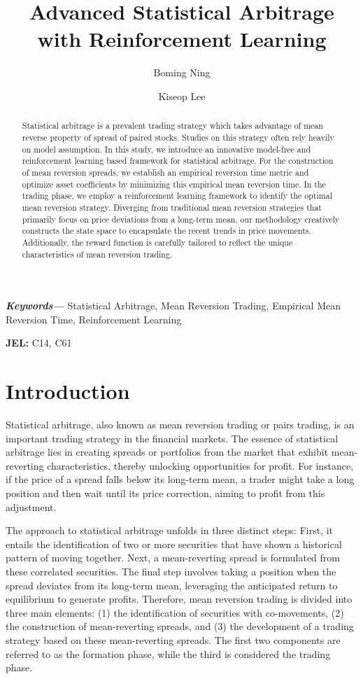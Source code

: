 \documentclass{article}
\title{Advanced Statistical Arbitrage with Reinforcement Learning}
\author[$\dag$,\thanks{Corresponding author. Email: ningb@purdue.edu}]{Boming Ning}
\author[$\dag$]{Kiseop Lee}
\affil[$\dag$]{Department of Statistics, Purdue University}
\providecommand{\keywords}[1]{\textbf{\textit{Keywords---}} #1}
\begin{document}
\maketitle

\begin{abstract}
Statistical arbitrage is a prevalent trading strategy which takes advantage of mean reverse property of spread of paired stocks. Studies on this strategy often rely heavily on model assumption. In this study, we introduce an innovative model-free and reinforcement learning based framework for statistical arbitrage. For the construction of mean reversion spreads, we establish an empirical reversion time metric and optimize asset coefficients by minimizing this empirical mean reversion time. In the trading phase, we employ a reinforcement learning framework to identify the optimal mean reversion strategy. Diverging from traditional mean reversion strategies that primarily focus on price deviations from a long-term mean, our methodology creatively constructs the state space to encapsulate the recent trends in price movements. Additionally, the reward function is carefully tailored to reflect the unique characteristics of mean reversion trading.

\end{abstract}

\keywords{Statistical Arbitrage, Mean Reversion Trading, Empirical Mean Reversion Time, Reinforcement Learning}

\indent \textbf{JEL:} C14, C61

\section{Introduction}
\label{sec1}
Statistical arbitrage, also known as mean reversion trading or pairs trading, is an important trading strategy in the financial markets. The essence of statistical arbitrage lies in creating spreads or portfolios from the market that exhibit mean-reverting characteristics, thereby unlocking opportunities for profit. For instance, if the price of a spread falls below its long-term mean, a trader might take a long position and then wait until its price correction, aiming to profit from this adjustment.

The approach to statistical arbitrage unfolds in three distinct steps: First, it entails the identification of two or more securities that have shown a historical pattern of moving together. Next, a mean-reverting spread is formulated from these correlated securities. The final step involves taking a position when the spread deviates from its long-term mean, leveraging the anticipated return to equilibrium to generate profits. Therefore, mean reversion trading is divided into three main elements: (1) the identification of securities with co-movements, (2) the construction of mean-reverting spreads, and (3) the development of a trading strategy based on these mean-reverting spreads. The first two components are referred to as the formation phase, while the third is considered the trading phase.
\end{document}
